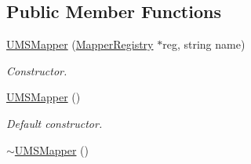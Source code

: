 \subsection*{Public Member Functions}
\begin{DoxyCompactItemize}
\item 
\hyperlink{classUMSMapper_a13fde7fd2808829ba7898685e6bda545}{UMSMapper} (\hyperlink{classMapperRegistry}{MapperRegistry} $\ast$reg, string name)
\begin{DoxyCompactList}\small\item\em Constructor. \item\end{DoxyCompactList}\item 
\hypertarget{classUMSMapper_abf7d60439d969568fe1cd582aff175b6}{
\hyperlink{classUMSMapper_abf7d60439d969568fe1cd582aff175b6}{UMSMapper} ()}
\label{classUMSMapper_abf7d60439d969568fe1cd582aff175b6}

\begin{DoxyCompactList}\small\item\em Default constructor. \item\end{DoxyCompactList}\item 
\hypertarget{classUMSMapper_aa1beda595a52460334711be78dba71b9}{
\hyperlink{classUMSMapper_aa1beda595a52460334711be78dba71b9}{$\sim$UMSMapper} ()}
\label{classUMSMapper_aa1beda595a52460334711be78dba71b9}


\end{DoxyCompactItemize}
